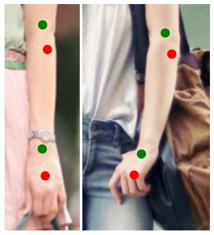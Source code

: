 \begin{figure}
    \includegraphics[height=\fh]{resources/Annotation_Correction/Fixing/fix_12}
    \hfill
    \includegraphics[height=\fh]{resources/Annotation_Correction/Fixing/fix_13}
    \hfill

\end{figure}
